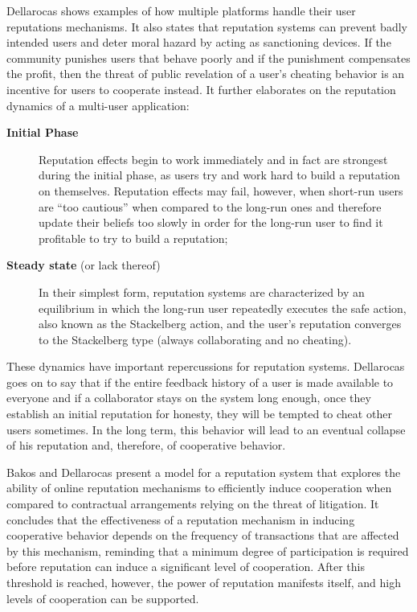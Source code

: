 Dellarocas \cite{Dellarocas2005-rep-mech} shows examples of how multiple platforms handle their user reputations mechanisms. It also states that reputation systems can prevent badly intended users and deter moral hazard by acting as sanctioning devices. If the community punishes users that behave poorly and if the punishment compensates the  profit, then the threat of public revelation of a user's cheating behavior is an incentive for users to cooperate instead. It further elaborates on the reputation dynamics of a multi-user application: 
\begin{description}
    \item[\textbf{Initial Phase}] Reputation effects begin to work immediately and in fact are strongest during the initial phase, as users try and work hard to build a reputation on themselves. Reputation effects may fail, however, when short-run users are “too cautious” when compared to the long-run ones and therefore update their beliefs too slowly in order for the long-run user to find it profitable to try to build a reputation;
    \item[\textbf{Steady state} (or lack thereof)] In their simplest form, reputation systems are characterized by an equilibrium in which the long-run user repeatedly executes the safe action, also known as the Stackelberg action, and the user's reputation converges to the Stackelberg type (always collaborating and no cheating).
\end{description}

These dynamics have important repercussions for reputation systems. Dellarocas goes on to say that if the entire feedback history of a user is made available to everyone and if a collaborator stays on the system long enough, once they establish an initial reputation for honesty, they will be tempted to cheat other users sometimes. In the long term, this behavior will lead to an eventual collapse of his reputation and, therefore, of cooperative behavior.

Bakos and Dellarocas \cite{Bakos2003} present a model for a reputation system that explores the ability of online reputation mechanisms to efficiently induce cooperation when compared to contractual arrangements relying on the threat of litigation. It concludes that the effectiveness of a reputation mechanism in inducing cooperative behavior depends on the frequency of transactions that are affected by this mechanism, reminding that a minimum degree of participation is required before reputation can induce a significant level of cooperation. After this threshold is reached, however, the power of reputation manifests itself, and high levels of cooperation can be supported.

